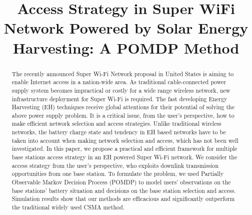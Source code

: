\documentclass[journal,12pt,draftclsnofoot,onecolumn]{IEEEtran}
\begin{document}
\title{Access Strategy in Super WiFi Network Powered by Solar Energy Harvesting: A POMDP Method}

\author{
	\small{}}
\maketitle

\begin{abstract}
The recently announced Super Wi-Fi Network proposal in United States is aiming to enable Internet access in a nation-wide area.
As traditional cable-connected power supply system becomes impractical or costly for a wide range wireless network,
new infrastructure deployment for Super Wi-Fi is required.
The fast developing Energy Harvesting (EH) techniques receive global
attentions for their potential of solving the above power supply problem.
It is a critical issue, from the user's perspective, how to make efficient network selection and access strategies. Unlike traditional wireless networks, the battery charge state and tendency in EH based networks have to be taken into account when making network selection and access, which has not been well investigated.
In this paper, we propose a practical and efficient framework for multiple base stations access strategy in an EH powered Super Wi-Fi network.
We consider the access strategy from the user's perspective,
who exploits downlink transmission opportunities from one base station.
To formulate the problem, we used Partially Observable Markov Decision Process (POMDP) to model users' observations on the base stations' battery situation and decisions on the base station selection and access. Simulation results show that our methods are efficacious and significantly outperform
the traditional widely used CSMA method.
\end{abstract}
\IEEEpeerreviewmaketitle
\end{document}
